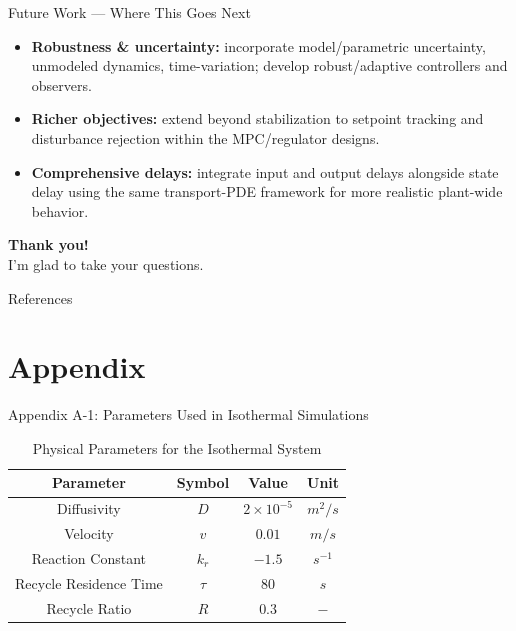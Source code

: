 \documentclass[8pt]{beamer}
\begin{document}
\begin{frame}[t]{Future Work — Where This Goes Next}
\begin{itemize}
  \item \textbf{Robustness \& uncertainty:} incorporate model/parametric uncertainty, unmodeled dynamics, time-variation; develop robust/adaptive controllers and observers.
  \item \textbf{Richer objectives:} extend beyond stabilization to setpoint tracking and disturbance rejection within the MPC/regulator designs.
  \item \textbf{Comprehensive delays:} integrate input and output delays alongside state delay using the same transport-PDE framework for more realistic plant-wide behavior.
\end{itemize}
\end{frame}


{
\begin{frame}[c, plain]
\centering
\textcolor{ualberta_darkgreen}{\LARGE \textbf{Thank you!}}\\[1ex]
\textcolor{ualberta_lightgreen}{\large I'm glad to take your questions.}
\end{frame}
}

\begin{frame}[allowframebreaks]{References}
\end{frame}

\appendix
\section{Appendix}
\begin{frame}{Appendix A-1: Parameters Used in Isothermal Simulations}
\begin{table}[ht]
    \centering
    \caption{Physical Parameters for the Isothermal System}
    \label{tab:pars_1}
    \begin{tabular}{|c|c|c|c|}
    \hline
    \textbf{Parameter}        & \textbf{Symbol} & \textbf{Value}     & \textbf{Unit}    \\ \hline
    Diffusivity               & $D$             & $2\times10^{-5}$   & ${m^2}/{s}$      \\ \hline
    Velocity                  & $v$             & $0.01$   & ${m}/{s}$        \\ \hline
    Reaction Constant         & $k_r$           & $-1.5$              & $s^{-1}$         \\ \hline
    Recycle Residence Time    & $\tau$          & $80$               & $s$              \\ \hline
    Recycle Ratio             & $R$             & $0.3$              & $-$              \\ \hline
    \end{tabular}
\end{table}
\end{frame}
\end{document}
